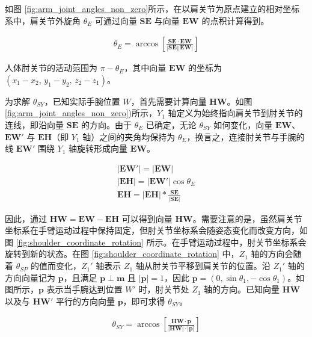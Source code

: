 如图 \ref{fig:arm_joint_angles_non_zero}所示，在以肩关节为原点建立的相对坐标系中，肩关节外旋角 $\theta_{E}$ 可通过向量 $\bm{SE}$ 与向量 $\bm{EW}$ 的点积计算得到。


\begin{eqnarray}
\theta_{E} = \arccos\left[\frac{\bm{SE}\cdot\bm{EW}}{|\bm{SE}||\bm{EW}|}\right]
\end{eqnarray}

人体肘关节的活动范围为 $\pi - \theta_{E}$，其中向量 $\bm{EW}$ 的坐标为 $(x_{1} - x_{2},\, y_{1} - y_{2},\, z_{2} - z_{1})$。

为求解 $\theta_{SY}$，已知实际手腕位置 $W$，首先需要计算向量 $\bm{HW}$。如图 \ref{fig:arm_joint_angles_non_zero})所示，$Y_1$ 轴定义为始终指向肩关节到肘关节的连线，即沿向量 $\bm{SE}$ 的方向。由于 $\theta_{E}$ 已确定，无论 $\theta_{SY}$ 如何变化，向量 $\bm{EW}$、$\bm{EW'}$ 与 $\bm{EH}$（即 $Y_1$ 轴）之间的夹角均保持为 $\theta_{E}$，换言之，连接肘关节与手腕的线 $\bm{EW'}$ 围绕 $Y_1$ 轴旋转形成向量 $\bm{EW}$。


\begin{gather}
	|\bm{EW'}|= |\bm{EW}| \\
	|\bm{EH}|= |\bm{EW'}|\cos\theta_{E} \\
	\bm{EH} =|\bm{EH}|\ast\frac{\bm{SE}}{|\bm{SE}|}
\end{gather}

因此，通过 $\bm{HW} = \bm{EW} - \bm{EH}$ 可以得到向量 $\bm{HW}$。需要注意的是，虽然肩关节坐标系在手臂运动过程中保持固定，但肘关节坐标系会随姿态变化而改变方向，如图 \ref{fig:shoulder_coordinate_rotation} 所示。在手臂运动过程中，肘关节坐标系会旋转到新的状态。在图 \ref{fig:shoulder_coordinate_rotation} 中，$Z_1$ 轴的方向会随着 $\theta_{SP}$ 的值而变化，$Z_1'$ 轴表示 $Z_1$ 轴从肘关节平移到肩关节的位置。沿 $Z_1'$ 轴的方向向量记为 $\bm{p}$，且满足 $\bm{p} \perp \bm{m}$ 且 $|\bm{p}| = 1$，因此 $\bm{p} = (0, \sin\theta_1, -\cos\theta_1)$。如图所示，$\bm{p}$ 表示当手腕达到位置 $W'$ 时，肘关节处 $Z_1$ 轴的方向。已知向量 $\bm{HW}$ 以及与 $\bm{HW'}$ 平行的方向向量 $\bm{p}$，即可求得 $\theta_{SY}$。

\begin{eqnarray}
	\theta_{SY} = \arccos\left[\frac{\bm{HW}\cdot\bm{p}}{|\bm{HW}|\cdot|\bm{p}|}\right]
\end{eqnarray}



